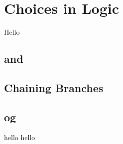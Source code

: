 \section{Choices in Logic}
\label{sec:flow:branch}

Hello

\subsection{ and }
\subsection{}
\subsection{Chaining Branches}
\subsection{ og }

\csharpsubsection{\csharp}
hello
hello
